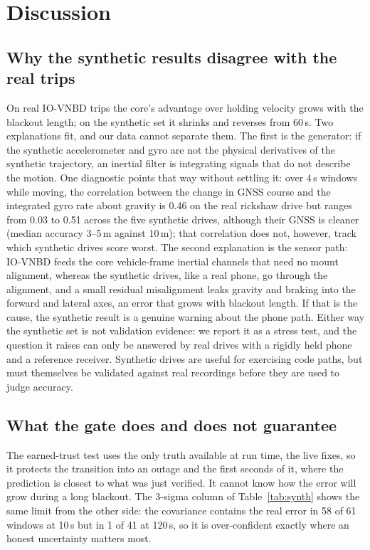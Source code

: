 \documentclass[conference]{IEEEtran}
\begin{document}
\section{Discussion}
\label{sec:discussion}

\subsection{Why the synthetic results disagree with the real trips}
On real IO-VNBD trips the core's advantage over holding velocity grows with the
blackout length; on the synthetic set it shrinks and reverses from 60\,s. Two
explanations fit, and our data cannot separate them. The first is the
generator: if the synthetic accelerometer and gyro are not the physical
derivatives of the synthetic trajectory, an inertial filter is integrating
signals that do not describe the motion. One diagnostic points that way without
settling it: over 4\,s windows while moving, the correlation between the change
in GNSS course and the integrated gyro rate about gravity is 0.46 on the real
rickshaw drive but ranges from 0.03 to 0.51 across the five synthetic drives,
although their GNSS is cleaner (median accuracy 3--5\,m against 10\,m); that
correlation does not, however, track which synthetic drives score worst. The
second explanation is the sensor path: IO-VNBD feeds the core vehicle-frame
inertial channels that need no mount alignment, whereas the synthetic drives,
like a real phone, go through the alignment, and a small residual
misalignment leaks gravity and braking into the forward and lateral axes,
an error that grows with blackout length. If that is the cause, the synthetic
result is a genuine warning about the phone path. Either way the synthetic set
is not validation evidence: we report it as a stress test, and the question it
raises can only be answered by real drives with a rigidly held phone and a
reference receiver. Synthetic drives are useful for exercising code paths, but
must themselves be validated against real recordings before they are used to
judge accuracy.

\subsection{What the gate does and does not guarantee}
The earned-trust test uses the only truth available at run time, the live
fixes, so it protects the transition into an outage and the first seconds of
it, where the prediction is closest to what was just verified. It cannot know
how the error will grow during a long blackout. The 3-sigma column of
Table~\ref{tab:synth} shows the same limit from the other side: the
covariance contains the real error in 58 of 61 windows at 10\,s but in 1 of 41
at 120\,s, so it is over-confident exactly where an honest uncertainty matters
most.
\end{document}
